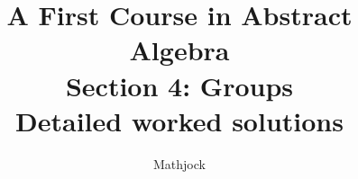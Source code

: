 
\title{\textbf{A First Course in Abstract Algebra}\\[0.3em]Section 4: Groups\\[0.3em]\large Detailed worked solutions}
\author{Mathjock}
\date{}

\maketitle
\bookinfo
\tableofcontents
\clearpage
\renewcommand{\thesection}{4}
\renewcommand{\theHsection}{fraleigh.4}


